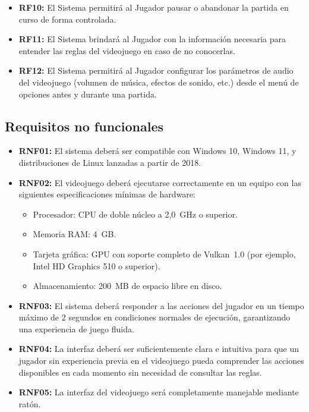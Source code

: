\begin{itemize}
	\item \textbf{RF10:} El Sistema permitirá al Jugador pausar o abandonar la partida en curso de forma controlada.
	
	\item \textbf{RF11:} El Sistema brindará al Jugador con la información necesaria para entender las reglas del videojuego en caso de no conocerlas.
	
	\item \textbf{RF12:} El Sistema permitirá al Jugador configurar los parámetros de audio del videojuego (volumen de música, efectos de sonido, etc.) desde el menú de opciones antes y durante una partida.
	
\end{itemize}

\subsection{Requisitos no funcionales}
\begin{itemize}
	
	\item \textbf{RNF01:} El sistema deberá ser compatible con Windows 10, Windows 11, y distribuciones de Linux lanzadas a partir de 2018.
	
	\item \textbf{RNF02:} El videojuego deberá ejecutarse correctamente en un equipo con las siguientes especificaciones mínimas de hardware:
	\begin{itemize}
		\item Procesador: CPU de doble núcleo a 2,0~GHz o superior.
		\item Memoria RAM: 4~GB.
		\item Tarjeta gráfica: GPU con soporte completo de Vulkan~1.0 (por ejemplo, Intel HD Graphics 510 o superior).
		\item Almacenamiento: 200~MB de espacio libre en disco.
	\end{itemize}
	
	\item \textbf{RNF03:} El sistema deberá responder a las acciones del jugador en un tiempo máximo de 2 segundos en condiciones normales de ejecución, garantizando una experiencia de juego fluida.
	
	\item \textbf{RNF04:} La interfaz deberá ser suficientemente clara e intuitiva para que un jugador sin experiencia previa en el videojuego pueda comprender las acciones disponibles en cada momento sin necesidad de consultar las reglas.
	
	\item \textbf{RNF05:} La interfaz del videojuego será completamente manejable mediante ratón.
	
\end{itemize}

